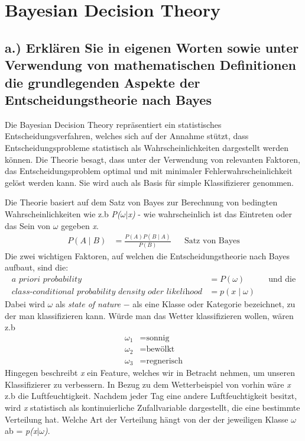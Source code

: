 \section{Bayesian Decision Theory}
\subsection*{a.) Erklären Sie in eigenen Worten sowie unter Verwendung von mathematischen Definitionen die grundlegenden Aspekte der Entscheidungstheorie nach Bayes}
Die Bayesian Decision Theory repräsentiert ein statistisches Entscheidungsverfahren, welches sich auf der Annahme stützt, dass Entscheidungsprobleme
statistisch als Wahrscheinlichkeiten dargestellt werden können. Die Theorie besagt, dass unter der Verwendung von relevanten Faktoren, das Entscheidungsproblem optimal
und mit minimaler Fehlerwahrscheinlichkeit gelöst werden kann. Sie wird auch als Basis für simple Klassifizierer genommen. 

Die Theorie basiert auf dem Satz von Bayes zur Berechnung von bedingten Wahrscheinlichkeiten wie z.b \textit{P($\omega$$\mid$x)} - wie wahrscheinlich ist das Eintreten oder das Sein von $\omega$ gegeben \textit{x}. 
\begin{align*}
	P(A\mid B) &= \frac{P(A)P(B\mid A)}{P(B)} && \text{Satz von Bayes}
\end{align*}
Die zwei wichtigen Faktoren, auf welchen die Entscheidungstheorie nach Bayes aufbaut,
sind die:
\begin{align*}
	\textit{a priori probability} &= P(\omega) && \text{und die} \\
	\textit{class-conditional probability density oder likelihood} &= p(x\mid \omega)
\end{align*}
Dabei wird $\omega$ als \textit{state of nature} $-$ als eine Klasse oder Kategorie bezeichnet, zu der man klassifizieren kann. Würde man das Wetter klassifizieren wollen, 
wären z.b 
\begin{align*}
	\omega_1 &= \text{sonnig} \\ 
	\omega_2 &= \text{bewölkt} \\ 
	\omega_3 &= \text{regnerisch}
\end{align*}
Hingegen beschreibt \textit{x} ein Feature, welches wir in Betracht nehmen, um unseren Klassifizierer zu verbessern. In Bezug zu dem Wetterbeispiel von vorhin wäre \textit{x} z.b die Luftfeuchtigkeit.
Nachdem jeder Tag eine andere Luftfeuchtigkeit besitzt, wird \textit{x} statistisch als kontinuierliche Zufallvariable dargestellt, die eine bestimmte Verteilung hat. Welche Art der Verteilung hängt von der
der jeweiligen Klasse $\omega$ ab = \textit{p(x$\mid$$\omega$)}.

